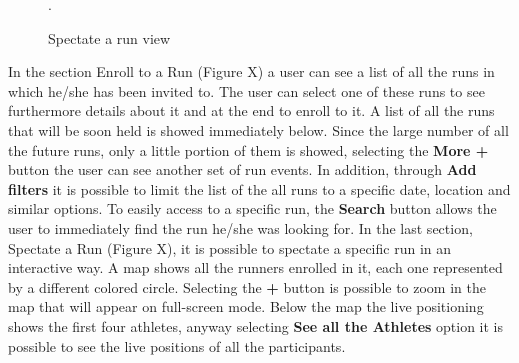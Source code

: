 \begin{enumerate}
\begin{figure}[H]
\begin{center}
\begin{minipage}[c]{.40\textwidth}
	\caption{Spectate a run view}.
        \end{minipage}
      \end{center}
\end{figure}
In the section Enroll to a Run (Figure X) a user can see a list of all the runs in which he/she has been invited to. The user can select one of these runs to see furthermore details about it and at the end to enroll to it. A list of all the runs that will be soon held is showed immediately below. Since the large number of all the future runs, only a little portion of them is showed, selecting the \textbf{More +} button the user can see another set of run events. In addition, through \textbf{Add filters} it is possible to limit the list of the all runs to a specific date, location and similar options. To easily access to a specific run, the \textbf{Search} button allows the user to immediately find the run he/she was looking for. In the last section, Spectate a Run (Figure X), it is possible to spectate a specific run in an interactive way. A map shows all the runners enrolled in it, each one represented by a different colored circle. Selecting the \textbf{+} button is possible to zoom in the map that will appear on full-screen mode. Below the map the live positioning shows the first four athletes, anyway selecting \textbf{See all the Athletes} option it is possible to see the live positions of all the participants.
\clearpage
\end{enumerate}